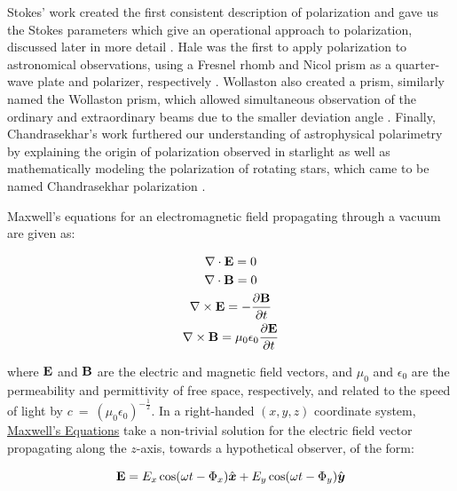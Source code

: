 Stokes' work created the first consistent description of polarization and gave us the Stokes parameters which give an operational approach to polarization, discussed later in more detail \citep{Stokes}. Hale was the first to apply polarization to astronomical observations, using a Fresnel rhomb and Nicol prism as a quarter-wave plate and polarizer, respectively \citep{Hale_pre,Hale_post}. Wollaston also created a prism, similarly named the Wollaston prism, which allowed simultaneous observation of the ordinary and extraordinary beams due to the smaller deviation angle \citep{WollPrism}. Finally, Chandrasekhar's work furthered our understanding of astrophysical polarimetry by explaining the origin of polarization observed in starlight as well as mathematically modeling the polarization of rotating stars, which came to be named Chandrasekhar polarization \citep{chandrasekhar}.
\prgph


Maxwell's equations for an electromagnetic field propagating through a vacuum are given as:

\begin{equation}
    \begin{gathered}
        \nabla \cdot \mathbf{E} = 0 \\
        \nabla \cdot \mathbf{B} = 0 \\
        \nabla \times \mathbf{E} = - \frac{\partial \mathbf{B}}{\partial t} \\
        \nabla \times \mathbf{B} = \mu_{0} \epsilon_{0} \frac{\partial \mathbf{E}}{\partial t}
    \end{gathered}
    \label{eq:Maxwell}
\end{equation}

\noindent where $\mathbf{E}$ and $\mathbf{B}$ are the electric and magnetic field vectors, and $\mu_{0}$ and $\epsilon_{0}$ are the permeability and permittivity of free space, respectively, and related to the speed of light by $c~=~(\mu_{0} \epsilon_{0})^{-\frac{1}{2}}$. In a right-handed $(x, y, z)$ coordinate system, \hyperref[eq:Maxwell]{Maxwell's Equations} take a non-trivial solution for the electric field vector propagating along the $z$-axis, towards a hypothetical observer, of the form:

\begin{equation}
    \mathbf{E} = E_{x} \cos(\omega t - \Phi_{x}) \hat{\boldsymbol{x}} +
                 E_{y} \cos(\omega t - \Phi_{y}) \hat{\boldsymbol{y}}
    \label{eq:Maxwell_sol}
\end{equation}

